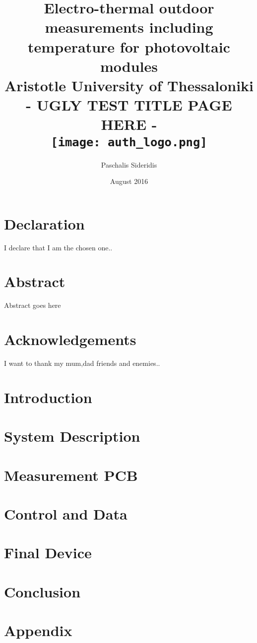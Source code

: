 \documentclass[11pt]{report}
\title{
	{Electro-thermal outdoor measurements including temperature for photovoltaic modules}\\
	{\large Aristotle University of Thessaloniki}\\
	\vspace{10mm} %
	{- UGLY TEST TITLE PAGE HERE -}\\
	\vspace{10mm} %
	{\texttt{[image: auth\_logo.png]}}
}
\author{Paschalis Sideridis}
\date{August 2016}
\begin{document}
\maketitle

\chapter*{Declaration}
I declare that I am the chosen one..

\chapter*{Abstract}
Abstract goes here

\chapter*{Acknowledgements}
I want to thank my mum,dad friends and enemies..

\tableofcontents

\chapter{Introduction}


\chapter{System Description}


\chapter{Measurement PCB}


\chapter{Control and Data}


\chapter{Final Device}


\chapter{Conclusion}


\appendix
\chapter{Appendix}


\printbibliography
\end{document}

